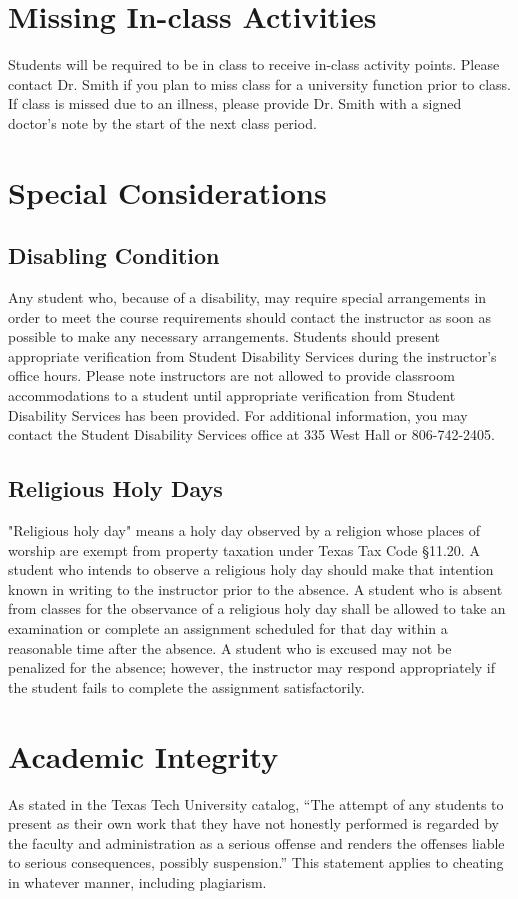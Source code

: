\documentclass[12pt, notitlepage]{article}   	%
\begin{document}
\section{Missing In-class Activities}
Students will be required to be in class to receive in-class activity points. 
Please contact Dr. Smith if you plan to miss class for a university function prior 
to class. If class is missed due to an illness, 
please provide Dr. Smith with a signed doctor’s note by the start of the next class 
period.

\section{Special Considerations}
\subsection{Disabling Condition}
Any student who, because of a disability, may require special arrangements in order to 
meet the course requirements should contact the instructor as soon as possible to make 
any necessary arrangements. Students should present appropriate verification from Student 
Disability Services during the instructor’s office hours. Please note instructors are not 
allowed to provide classroom accommodations to a student until appropriate verification 
from Student Disability Services has been provided.  For additional information, you may 
contact the Student Disability Services office at 335 West Hall or 806-742-2405.

\subsection{Religious Holy Days}
"Religious holy day" means a holy day observed by a religion whose places of worship are 
exempt from property taxation under Texas Tax Code §11.20.
A student who intends to observe a religious holy day should make that intention known 
in writing to the instructor prior to the absence. A student who is absent from classes 
for the observance of a religious holy day shall be allowed to take an examination or 
complete an assignment scheduled for that day within a reasonable time after the absence.
A student who is excused may not be penalized for the absence; however, the instructor 
may respond appropriately if the student fails to complete the assignment satisfactorily.

\section{Academic Integrity}
As stated in the Texas Tech University catalog, “The attempt of any students to present 
as their own work that they have not honestly performed is regarded by the faculty and 
administration as a serious offense and renders the offenses liable to serious 
consequences, possibly suspension.” This statement applies to cheating in whatever 
manner, including plagiarism.
\end{document}
